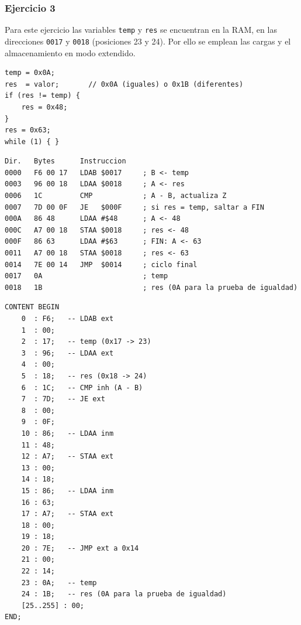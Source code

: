 \documentclass[letterpaper,12pt]{article}
\newcommand{\hx}[1]{\texttt{#1}}
\begin{document}
\subsubsection{Ejercicio 3}

Para este ejercicio las variables \texttt{temp} y \texttt{res} se encuentran en la RAM, en las direcciones \hx{0017} y \hx{0018} (posiciones 23 y 24). Por ello se emplean las cargas y el almacenamiento en modo extendido.

\begin{lstlisting}[style=pseudo]
temp = 0x0A;
res  = valor;       // 0x0A (iguales) o 0x1B (diferentes)
if (res != temp) {
    res = 0x48;
}
res = 0x63;
while (1) { }
\end{lstlisting}

\begin{lstlisting}[style=asm,caption={Ejercicio 3 en ensamblador.},label={lst:asm3}]
Dir.   Bytes      Instruccion
0000   F6 00 17   LDAB $0017     ; B <- temp
0003   96 00 18   LDAA $0018     ; A <- res
0006   1C         CMP            ; A - B, actualiza Z
0007   7D 00 0F   JE   $000F     ; si res = temp, saltar a FIN
000A   86 48      LDAA #$48      ; A <- 48
000C   A7 00 18   STAA $0018     ; res <- 48
000F   86 63      LDAA #$63      ; FIN: A <- 63
0011   A7 00 18   STAA $0018     ; res <- 63
0014   7E 00 14   JMP  $0014     ; ciclo final
0017   0A                        ; temp
0018   1B                        ; res (0A para la prueba de igualdad)
\end{lstlisting}

\begin{lstlisting}[style=mif,caption={Contenido de \texttt{mem\_content.mif} para el ejercicio 3.},label={lst:mif3}]
CONTENT BEGIN
    0  : F6;   -- LDAB ext
    1  : 00;
    2  : 17;   -- temp (0x17 -> 23)
    3  : 96;   -- LDAA ext
    4  : 00;
    5  : 18;   -- res (0x18 -> 24)
    6  : 1C;   -- CMP inh (A - B)
    7  : 7D;   -- JE ext
    8  : 00;
    9  : 0F;
    10 : 86;   -- LDAA inm
    11 : 48;
    12 : A7;   -- STAA ext
    13 : 00;
    14 : 18;
    15 : 86;   -- LDAA inm
    16 : 63;
    17 : A7;   -- STAA ext
    18 : 00;
    19 : 18;
    20 : 7E;   -- JMP ext a 0x14
    21 : 00;
    22 : 14;
    23 : 0A;   -- temp
    24 : 1B;   -- res (0A para la prueba de igualdad)
    [25..255] : 00;
END;
\end{lstlisting}
\end{document}
